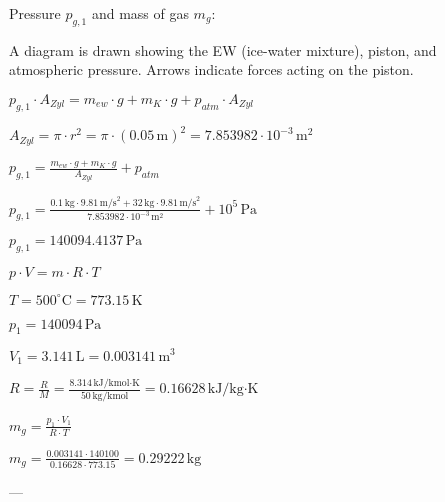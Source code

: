 Pressure \( p_{g,1} \) and mass of gas \( m_g \):  

A diagram is drawn showing the EW (ice-water mixture), piston, and atmospheric pressure. Arrows indicate forces acting on the piston.  

\( p_{g,1} \cdot A_{Zyl} = m_{ew} \cdot g + m_{K} \cdot g + p_{atm} \cdot A_{Zyl} \)  

\( A_{Zyl} = \pi \cdot r^2 = \pi \cdot (0.05 \, \text{m})^2 = 7.853982 \cdot 10^{-3} \, \text{m}^2 \)  

\( p_{g,1} = \frac{m_{ew} \cdot g + m_{K} \cdot g}{A_{Zyl}} + p_{atm} \)  

\( p_{g,1} = \frac{0.1 \, \text{kg} \cdot 9.81 \, \text{m/s}^2 + 32 \, \text{kg} \cdot 9.81 \, \text{m/s}^2}{7.853982 \cdot 10^{-3} \, \text{m}^2} + 10^5 \, \text{Pa} \)  

\( p_{g,1} = 140094.4137 \, \text{Pa} \)  

\( p \cdot V = m \cdot R \cdot T \)  

\( T = 500^\circ \text{C} = 773.15 \, \text{K} \)  

\( p_1 = 140094 \, \text{Pa} \)  

\( V_1 = 3.141 \, \text{L} = 0.003141 \, \text{m}^3 \)  

\( R = \frac{R}{M} = \frac{8.314 \, \text{kJ/kmol·K}}{50 \, \text{kg/kmol}} = 0.16628 \, \text{kJ/kg·K} \)  

\( m_g = \frac{p_1 \cdot V_1}{R \cdot T} \)  

\( m_g = \frac{0.003141 \cdot 140100}{0.16628 \cdot 773.15} = 0.29222 \, \text{kg} \)  

---
